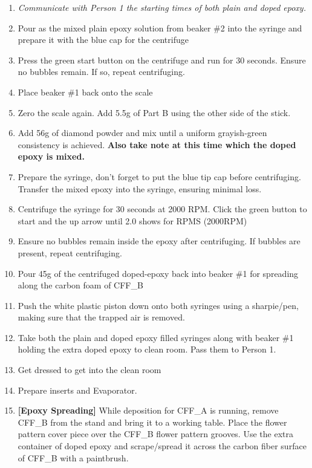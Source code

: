 \documentclass[12pt]{cornelltfpxsop}
\begin{document}
\begin{enumerate}
        \item \textit{Communicate with Person 1 the starting times of both plain and doped epoxy.}   
        \item Pour as the mixed plain epoxy solution from beaker \#2 into the syringe and prepare it with the blue cap for the centrifuge
        \item Press the green start button on the centrifuge and run for 30 seconds. Ensure no bubbles remain. If so, repeat centrifuging.
        \item Place beaker \#1 back onto the scale 
        \item Zero the scale again. Add 5.5g of Part B using the other side of the stick.    
        \item Add 56g of diamond powder and mix until a uniform grayish-green consistency is achieved.  \textbf{Also take note at this time which the doped epoxy is mixed.}
        \item Prepare the syringe, don't forget to put the blue tip cap before centrifuging. Transfer the mixed epoxy into the syringe, ensuring minimal loss.
        \item Centrifuge the syringe for 30 seconds at 2000 RPM. Click the green button to start and the up arrow until 2.0 shows for RPMS (2000RPM)
        \item Ensure no bubbles remain inside the epoxy after centrifuging. If bubbles are present, repeat centrifuging. 
        \item Pour 45g of the centrifuged doped-epoxy back into beaker \#1 for spreading along the carbon foam of CFF\_B
        \item Push the white plastic piston down onto both syringes using a sharpie/pen, making sure that the trapped air is removed. 
        \item Take both the plain and doped epoxy filled syringes along with beaker \#1 holding the extra doped epoxy to clean room. Pass them to Person 1.
        \item Get dressed to get into the clean room   
        \item Prepare inserts and Evaporator.
        \item \textbf{[Epoxy Spreading]} While deposition for CFF\_A is running, remove CFF\_B from the stand and bring it to a working table. Place the flower pattern cover piece over the CFF\_B flower pattern grooves. Use the extra container of doped epoxy and scrape/spread it across the carbon fiber surface of CFF\_B with a paintbrush. 

\end{enumerate}
\end{document}
